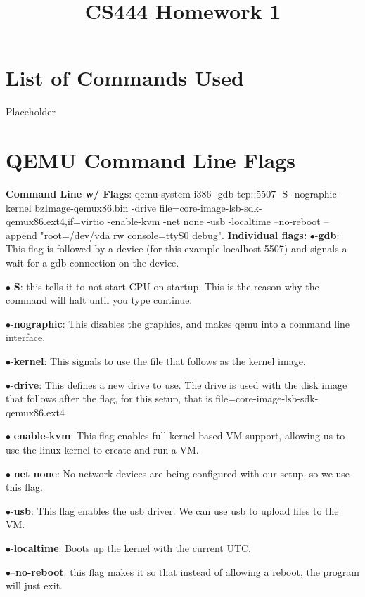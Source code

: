 \documentclass[letterpaper,10pt,fleqn,draftclsnofoot,onecolumn]{IEEEtran}
\title{CS444 Homework 1}
\author{\name}
\begin{document}
	\maketitle
	\hrulefill
	\section*{List of Commands Used}
	Placeholder
	
	
	\section*{ QEMU Command Line Flags }
	{\bf Command Line w/ Flags}: \newline
	qemu-system-i386 -gdb tcp::5507 -S -nographic -kernel bzImage-qemux86.bin -drive file=core-image-lsb-sdk-qemux86.ext4,if=virtio -enable-kvm -net none -usb -localtime --no-reboot --append "root=/dev/vda rw console=ttyS0 debug".
	\newline
	\newline
	{\bf Individual flags:}
	\newline
	$\bullet$-{\bf gdb}: This flag is followed by a device (for this example localhost 5507) and signals a wait for a gdb connection on the device.
	
	$\bullet$-{\bf S}: this tells it to not start CPU on startup. This is the reason why the command will halt until you type continue.
	
	$\bullet$-{\bf nographic}: This disables the graphics, and makes qemu into a command line interface.
	
	$\bullet$-{\bf kernel}: This signals to use the file that follows as the kernel image. 
	
	$\bullet$-{\bf drive}: This defines a new drive to use. The drive is used with the disk image that follows after the flag, for this setup, that is file=core-image-lsb-sdk-qemux86.ext4
	
	$\bullet$-{\bf enable-kvm}: This flag enables full kernel based VM support, allowing us to use the linux kernel to create and run a VM.
	
	$\bullet$-{\bf net none}: No network devices are being configured with our setup, so we use this flag.
	
	$\bullet$-{\bf usb}: This flag enables the usb driver. We can use usb to upload files to the VM. 
	
	$\bullet$-{\bf localtime}: Boots up the kernel with the current UTC.
	
	$\bullet$--{\bf no-reboot}: this flag makes it so that instead of allowing a reboot, the program will just exit.
	
\end{document}
